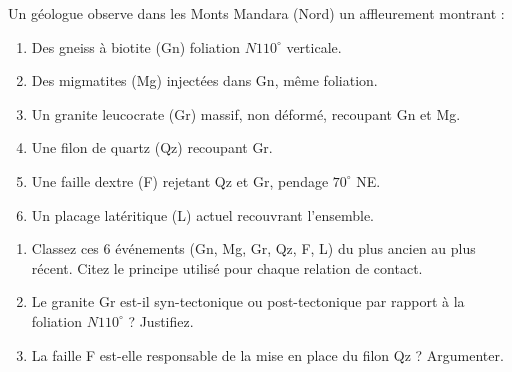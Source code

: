 \documentclass[11pt]{article}
\begin{document}
\begin{exercice}
Un géologue observe dans les Monts Mandara (Nord) un affleurement montrant :
\begin{enumerate}
    \item Des gneiss à biotite (Gn) foliation $N110^\circ$ verticale.
    \item Des migmatites (Mg) injectées dans Gn, même foliation.
    \item Un granite leucocrate (Gr) massif, non déformé, recoupant Gn et Mg.
    \item Une filon de quartz (Qz) recoupant Gr.
    \item Une faille dextre (F) rejetant Qz et Gr, pendage $70^\circ$ NE.
    \item Un placage latéritique (L) actuel recouvrant l'ensemble.
\end{enumerate}
\begin{enumerate}
    \item Classez ces 6 événements (Gn, Mg, Gr, Qz, F, L) du plus ancien au plus récent. Citez le principe utilisé pour chaque relation de contact.
    \item Le granite Gr est-il syn-tectonique ou post-tectonique par rapport à la foliation $N110^\circ$ ? Justifiez.
    \item La faille F est-elle responsable de la mise en place du filon Qz ? Argumenter.
\end{enumerate}
\end{exercice}
\end{document}
